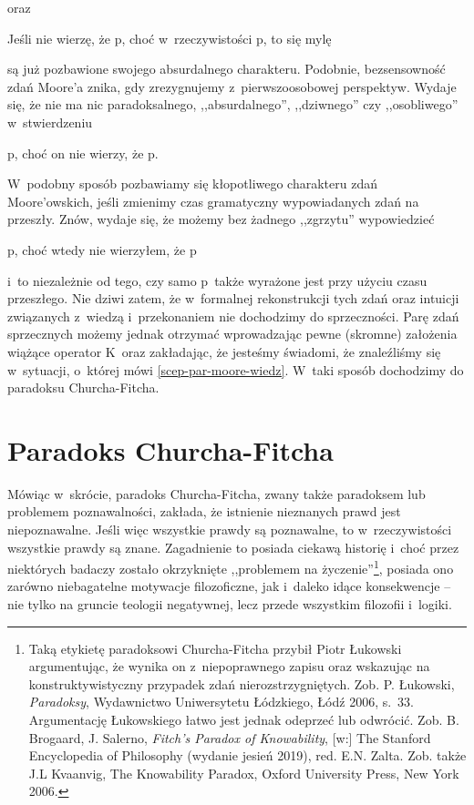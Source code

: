 {oraz

Jeśli nie wierzę, że p, choć w~rzeczywistości p, to się mylę

są już pozbawione swojego absurdalnego charakteru. Podobnie, bezsensowność zdań Moore'a znika, gdy zrezygnujemy z~pierwszoosobowej perspektyw. Wydaje się, że nie ma nic paradoksalnego, ,,absurdalnego'', ,,dziwnego'' czy ,,osobliwego'' w~stwierdzeniu

p, choć on nie wierzy, że p.

W~podobny sposób pozbawiamy się kłopotliwego charakteru zdań Moore'owskich, jeśli zmienimy czas gramatyczny wypowiadanych zdań na przeszły. Znów, wydaje się, że możemy bez żadnego ,,zgrzytu'' wypowiedzieć

p, choć wtedy nie wierzyłem, że p

i~to niezależnie od tego, czy samo p~także wyrażone jest przy użyciu czasu przeszłego. Nie dziwi zatem, że w~formalnej rekonstrukcji tych zdań oraz intuicji związanych z~wiedzą i~przekonaniem nie dochodzimy do sprzeczności. Parę zdań sprzecznych możemy jednak otrzymać wprowadzając pewne (skromne) założenia wiążące operator K~oraz zakładając, że jesteśmy świadomi, że znaleźliśmy się w~sytuacji, o~której mówi \ref{scep-par-moore-wiedz}. W~taki sposób dochodzimy do paradoksu Churcha-Fitcha.


\section{Paradoks Churcha-Fitcha}

Mówiąc w~skrócie, paradoks Churcha-Fitcha, zwany także paradoksem lub problemem poznawalności, zakłada, że istnienie nieznanych prawd jest niepoznawalne. Jeśli więc wszystkie prawdy są poznawalne, to w~rzeczywistości wszystkie prawdy są znane. Zagadnienie to posiada ciekawą historię i~choć przez niektórych badaczy zostało okrzyknięte ,,problemem na życzenie''\footnote{Taką etykietę paradoksowi Churcha-Fitcha przybił Piotr Łukowski argumentując, że wynika on z~niepoprawnego zapisu oraz wskazując na konstruktywistyczny przypadek zdań nierozstrzygniętych. Zob. P. Łukowski, \textit{Paradoksy}, Wydawnictwo Uniwersytetu Łódzkiego, Łódź 2006, s.~33. Argumentację Łukowskiego łatwo jest jednak odeprzeć lub odwrócić. Zob. B. Brogaard, J. Salerno, \textit{Fitch's Paradox of Knowability}, [w:] The Stanford Encyclopedia of Philosophy (wydanie jesień 2019), red. E.N. Zalta. Zob. także J.L Kvaanvig, The Knowability Paradox, Oxford University Press, New York 2006.}, posiada ono zarówno niebagatelne motywacje filozoficzne, jak i~daleko idące konsekwencje -- nie tylko na gruncie teologii negatywnej, lecz przede wszystkim filozofii i~logiki.

}
